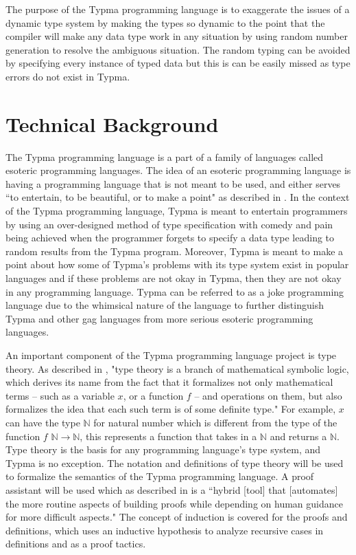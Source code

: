 \documentclass[10pt,twocolumn]{article}
\begin{document}
The purpose of the Typma programming language is to exaggerate the issues of a dynamic type system by making the types so dynamic to the point that the compiler will make any data type work in any situation by using random number generation to resolve the ambiguous situation. The random typing can be avoided by specifying every instance of typed data but this is can be easily missed as type errors do not exist in Typma.

\section{Technical Background}

The Typma programming language is a part of a family of languages called esoteric programming languages. The idea of an esoteric programming language is having a programming language that is not meant to be used, and either serves ``to
entertain, to be beautiful, or to make a point" as described in \textcite{Morr2014Esoteric}. In the context of the Typma programming language, Typma is meant to entertain programmers by using an over-designed method of type specification with comedy and pain being achieved when the programmer forgets to specify a data type leading to random results from the Typma program. Moreover, Typma is meant to make a point about how some of Typma's problems with its type system exist in popular languages and if these problems are not okay in Typma, then they are not okay in any programming language. Typma can be referred to as a joke programming language due to the whimsical nature of the language to further distinguish Typma and other gag languages from more serious esoteric programming languages.

An important component of the Typma programming language project is type theory. As described in \textcite{typetheory}, "type theory is a branch of mathematical symbolic logic, which derives its name from the fact that it formalizes not only mathematical terms – such as a variable $x$, or a function $f$ – and operations on them, but also formalizes the idea that each such term is of some definite type." For example, $x$ can have the type $\mathbb{N}$ for natural number which is different from the type of the function $f$ $\mathbb{N} \rightarrow \mathbb{N}$, this represents a function that takes in a $\mathbb{N}$ and returns a $\mathbb{N}$. Type theory is the basis for any programming language's type system, and Typma is no exception. The notation and definitions of type theory will be used to formalize the semantics of the Typma programming language. A proof assistant will be used which as described in \textcite{Pierce2021Software} is a ``hybrid [tool] that [automates] the more routine aspects of building proofs while depending on human guidance for more difficult aspects." The concept of induction is covered for the proofs and definitions, which uses an inductive hypothesis to analyze recursive cases in definitions and as a proof tactics.
\end{document}
